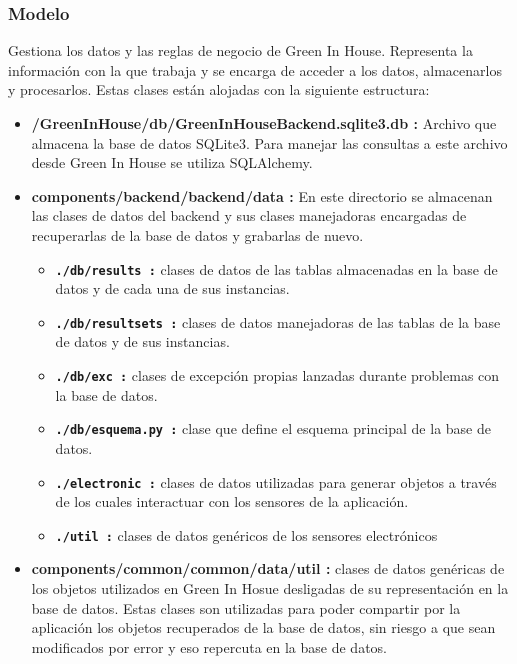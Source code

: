         \subsubsection{Modelo} 
        Gestiona los datos y las reglas de negocio de Green In House. Representa la información con la que trabaja y se encarga de acceder a los datos, almacenarlos y procesarlos. Estas clases están alojadas con la siguiente estructura:
        \begin{itemize}
            \item \textbf{/GreenInHouse/db/GreenInHouseBackend.sqlite3.db :} Archivo que almacena la base de datos SQLite3. Para manejar las consultas a este archivo desde Green In House se utiliza SQLAlchemy.
            \item \textbf{components/backend/backend/data :} En este directorio se almacenan las clases de datos del backend y sus clases manejadoras encargadas de recuperarlas de la base de datos y grabarlas de nuevo.
            \begin{itemize}
                \item \textbf{\texttt{./db/results :}} clases de datos de las tablas almacenadas en la base de datos y de cada una de sus instancias.
                \item \textbf{\texttt{./db/resultsets :}} clases de datos manejadoras de las tablas de la base de datos y de sus instancias.
                \item \textbf{\texttt{./db/exc :}} clases de excepción propias lanzadas durante problemas con la base de datos.
                \item \textbf{\texttt{./db/esquema.py :}} clase que define el esquema principal de la base de datos.
                \item \textbf{\texttt{./electronic :}} clases de datos utilizadas para generar objetos a través de los cuales interactuar con los sensores de la aplicación.
                \item \textbf{\texttt{./util :}} clases de datos genéricos de los sensores electrónicos
            \end{itemize}
            \item \textbf{components/common/common/data/util :} clases de datos genéricas de los objetos utilizados en Green In Hosue desligadas de su representación en la base de datos. Estas clases son utilizadas para poder compartir por la aplicación los objetos recuperados de la base de datos, sin riesgo a que sean modificados por error y eso repercuta en la base de datos.
        \end{itemize}  
        

